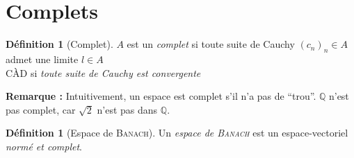 \documentclass[11pt,a4paper]{report}
\theoremstyle{definition}
\newtheorem{dfn}[theorem]{Définition}
\begin{document}
\section{Complets} %
\label{sec:complets}
\begin{dfn}[Complet]
$A$ est un \emph{complet} si toute suite de Cauchy $(c_n)_n \in A$ admet une limite $l\in A$\\
CÀD si \emph{toute suite de Cauchy est convergente}
\end{dfn}
\textbf{Remarque :} Intuitivement, un espace est complet s'il n'a pas de \enquote{trou}. $\mathbb{Q}$ n'est pas complet, car $\sqrt{2}$ n'est pas dans $\mathbb{Q}$.

\begin{dfn}[Espace de \textsc{Banach}]
Un \emph{espace de \textsc{Banach}} est un espace-vectoriel \emph{normé et complet}.
\end{dfn}

\end{document}

